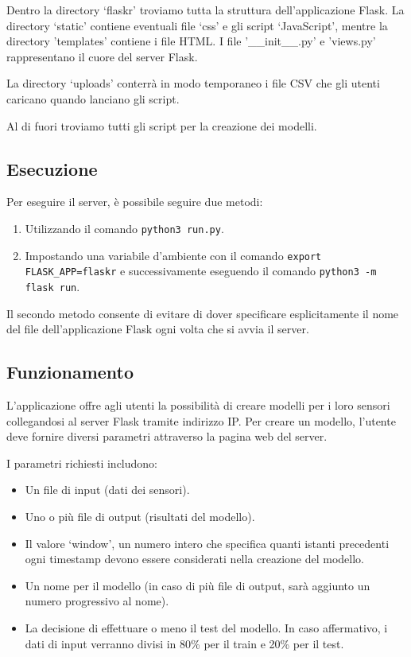 \documentclass[a4paper,10pt]{article}
\begin{document}
Dentro la directory `flaskr' troviamo tutta la struttura dell'applicazione Flask. La directory `static' contiene eventuali file `css' e gli script `JavaScript', mentre la directory 'templates' contiene i file HTML. I file '\_\_init\_\_.py' e 'views.py' rappresentano il cuore del server Flask.

La directory `uploads' conterrà in modo temporaneo i file CSV che gli utenti caricano quando lanciano gli script. 

Al di fuori troviamo tutti gli script per la creazione dei modelli.



\subsection{Esecuzione}
Per eseguire il server, è possibile seguire due metodi:

\begin{enumerate}
  \item Utilizzando il comando \texttt{python3 run.py}.
  \item Impostando una variabile d'ambiente con il comando \texttt{export FLASK\_APP=flaskr} e successivamente eseguendo il comando \texttt{python3 -m flask run}.
\end{enumerate}

Il secondo metodo consente di evitare di dover specificare esplicitamente il nome del file dell'applicazione Flask ogni volta che si avvia il server.

\subsection{Funzionamento}
L'applicazione offre agli utenti la possibilità di creare modelli per i loro sensori collegandosi al server Flask tramite indirizzo IP. Per creare un modello, l'utente deve fornire diversi parametri attraverso la pagina web del server.

I parametri richiesti includono:
\begin{itemize}
  \item Un file di input (dati dei sensori).
  \item Uno o più file di output (risultati del modello).
  \item Il valore `window', un numero intero che specifica quanti istanti precedenti ogni timestamp devono essere considerati nella creazione del modello.
  \item Un nome per il modello (in caso di più file di output, sarà aggiunto un numero progressivo al nome).
  \item La decisione di effettuare o meno il test del modello. In caso affermativo, i dati di input verranno divisi in 80\% per il train e 20\% per il test.
\end{itemize}
\end{document}
